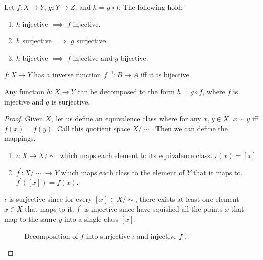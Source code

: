   \begin{theorem}
    Let $f: X \rightarrow Y$, $g: Y \rightarrow Z$, and $h = g \circ f$. The following hold: 
    \begin{enumerate}
      \item $h$ injective $\implies$ $f$ injective. 
      \item $h$ surjective $\implies$ $g$ surjective. 
      \item $h$ bijective $\implies$ $f$ injective and $g$ bijective. 
    \end{enumerate}
  \end{theorem} 

  \begin{corollary}
    $f: X \rightarrow Y$ has a inverse function $f^{-1}: B \rightarrow A$ iff it is bijective. 
  \end{corollary}

  \begin{corollary}[Decomposition]
    Any function $h: X \rightarrow Y$ can be decomposed to the form $h = g \circ f$, where $f$ is injective and $g$ is surjective. 
  \end{corollary}
  \begin{proof}
    Given $X$, let us define an equivalence class where for any $x, y \in X$, $x \sim y$ iff $f(x) = f(y)$. Call this quotient space $X / \sim$. Then we can define the mappings. 
    \begin{enumerate}
      \item $\iota: X \rightarrow X / \sim$ which maps each element to its equivalence class. $\iota(x) = [x]$
      \item $f^\prime: X / \sim \rightarrow Y$ which maps each class to the element of $Y$ that it maps to. $f^\prime ([x]) = f(x)$. 
    \end{enumerate}
    $\iota$ is surjective since for every $[x] \in X / \sim$, there exists at least one element $x \in X$ that maps to it. $f^\prime$ is injective since have squished all the points $x$ that map to the same $y$ into a single class $[x]$. 

    \begin{figure}[H]
      \centering 
      \caption{Decomposition of $f$ into surjective $\iota$ and injective $f^\prime$. } 
      \label{fig:decomposition}
    \end{figure}
  \end{proof}

